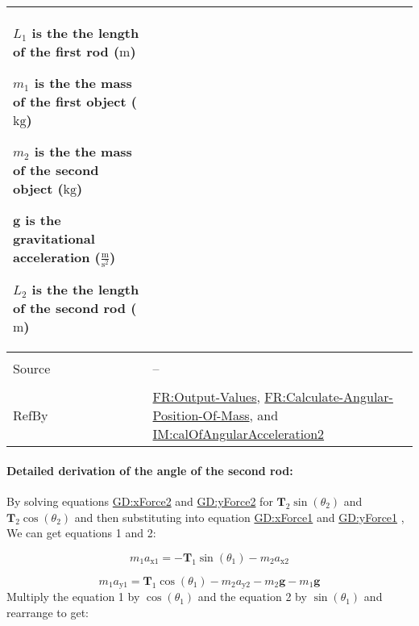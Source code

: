 \documentclass[12pt]{article}
\begin{document}
\begin{minipage}{\textwidth}
\begin{tabular}{>{\raggedright}p{}>{\raggedright\arraybackslash}p{}}
\begin{symbDescription}
              \item{${L_{1}}$ is the the length of the first rod (${\text{m}}$)}
              \item{${m_{1}}$ is the the mass of the first object (${\text{kg}}$)}
              \item{${m_{2}}$ is the the mass of the second object (${\text{kg}}$)}
              \item{$\symbf{g}$ is the gravitational acceleration ($\frac{\text{m}}{\text{s}^{2}}$)}
              \item{${L_{2}}$ is the the length of the second rod (${\text{m}}$)}
              \end{symbDescription}
\\ \midrule \\
Source & --
         
\\ \midrule \\
RefBy & \hyperref[outputValues]{FR:Output-Values}, \hyperref[calcAngPos]{FR:Calculate-Angular-Position-Of-Mass}, and \hyperref[IM:calOfAngularAcceleration2]{IM:calOfAngularAcceleration2}
        
\\ \bottomrule
\end{tabular}
\end{minipage}
\paragraph{Detailed derivation of the angle of the second rod:}
\label{IM:calOfAngularAcceleration2Deriv}
By solving equations \hyperref[GD:xForce2]{GD:xForce2} and \hyperref[GD:yForce2]{GD:yForce2} for ${\symbf{T}_{2}} \sin\left({θ_{2}}\right)$ and ${\symbf{T}_{2}} \cos\left({θ_{2}}\right)$ and then substituting into equation \hyperref[GD:xForce1]{GD:xForce1} and \hyperref[GD:yForce1]{GD:yForce1} , We can get equations 1 and 2:

\begin{displaymath}
{m_{1}} {a_{\text{x}1}}=-{\symbf{T}_{1}} \sin\left({θ_{1}}\right)-{m_{2}} {a_{\text{x}2}}
\end{displaymath}

\begin{displaymath}
{m_{1}} {a_{\text{y}1}}={\symbf{T}_{1}} \cos\left({θ_{1}}\right)-{m_{2}} {a_{\text{y}2}}-{m_{2}} \symbf{g}-{m_{1}} \symbf{g}
\end{displaymath}
Multiply the equation 1 by $\cos\left({θ_{1}}\right)$ and the equation 2 by $\sin\left({θ_{1}}\right)$ and rearrange to get:
\end{document}

